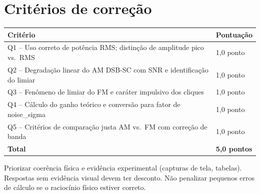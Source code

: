 \documentclass[11pt,a4paper]{article}
\begin{document}
\section*{Critérios de correção}
\begin{tabular}{ll}
  \toprule
  Critério & Pontuação \\
  \midrule
  Q1 -- Uso correto de potência RMS; distinção de amplitude pico vs.\ RMS & 1,0 ponto \\
  Q2 -- Degradação linear do AM DSB-SC com SNR e identificação do limiar   & 1,0 ponto \\
  Q3 -- Fenômeno de limiar do FM e caráter impulsivo dos cliques            & 1,0 ponto \\
  Q4 -- Cálculo do ganho teórico e conversão para fator de noise\_sigma     & 1,0 ponto \\
  Q5 -- Critérios de comparação justa AM vs.\ FM com correção de banda      & 1,0 ponto \\
  \midrule
  \textbf{Total} & \textbf{5,0 pontos} \\
  \bottomrule
\end{tabular}

\bigskip
\begin{nota}
  Priorizar coerência física e evidência experimental (capturas de tela, tabelas).
  Respostas sem evidência visual devem ter desconto. Não penalizar pequenos erros
  de cálculo se o raciocínio físico estiver correto.
\end{nota}
\end{document}
